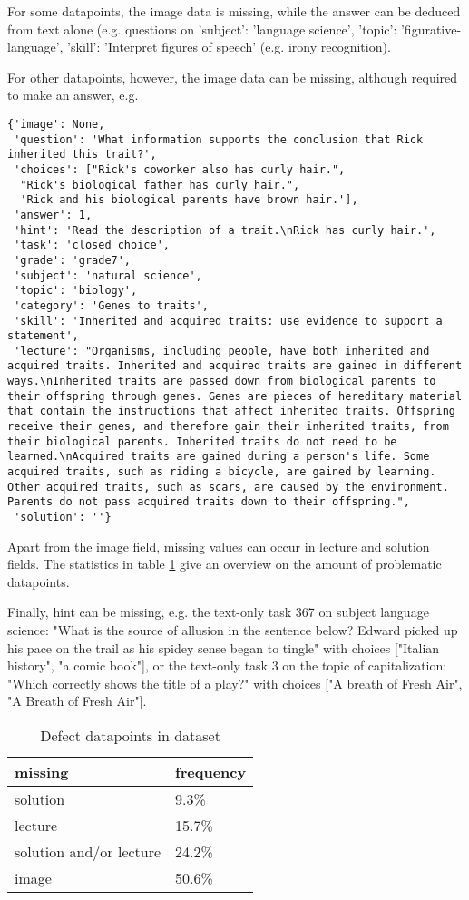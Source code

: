 \documentclass[10pt]{article}
\begin{document}
For some datapoints, the image data is missing, while the answer can be deduced from text alone (e.g. questions on 'subject': 'language science', 'topic': 'figurative-language', 'skill': 'Interpret figures of speech' (e.g. irony recognition). 

For other datapoints, however, the image data can be missing, although required to make an answer, e.g.
\begin{verbatim}
{'image': None,
 'question': 'What information supports the conclusion that Rick inherited this trait?',
 'choices': ["Rick's coworker also has curly hair.",
  "Rick's biological father has curly hair.",
  'Rick and his biological parents have brown hair.'],
 'answer': 1,
 'hint': 'Read the description of a trait.\nRick has curly hair.',
 'task': 'closed choice',
 'grade': 'grade7',
 'subject': 'natural science',
 'topic': 'biology',
 'category': 'Genes to traits',
 'skill': 'Inherited and acquired traits: use evidence to support a statement',
 'lecture': "Organisms, including people, have both inherited and acquired traits. Inherited and acquired traits are gained in different ways.\nInherited traits are passed down from biological parents to their offspring through genes. Genes are pieces of hereditary material that contain the instructions that affect inherited traits. Offspring receive their genes, and therefore gain their inherited traits, from their biological parents. Inherited traits do not need to be learned.\nAcquired traits are gained during a person's life. Some acquired traits, such as riding a bicycle, are gained by learning. Other acquired traits, such as scars, are caused by the environment. Parents do not pass acquired traits down to their offspring.",
 'solution': ''}
\end{verbatim}

Apart from the image field, missing values can occur in lecture and solution fields. The statistics in table \ref{table:dataset-stats} give an overview on the amount of problematic datapoints. 

Finally, hint can be missing, e.g. the text-only task 367 on subject language science: "What is the source of allusion in the sentence below? Edward picked up his pace on the trail as his spidey sense began to tingle" with choices ["Italian history", "a comic book"], or the text-only task 3 on the topic of capitalization: "Which correctly shows the title of a play?" with choices ["A breath of Fresh Air", "A Breath of Fresh Air"]. 

\begin{table}[h!]
\centering
\begin{tabular}{ll}\toprule
	missing & frequency \\\midrule
	solution & 9.3\% \\
	lecture & 15.7\% \\
	solution and/or lecture & 24.2\% \\
	image & 50.6\%\\\bottomrule
\end{tabular}
\caption{Defect datapoints in dataset}
\label{table:dataset-stats}
\end{table}
\end{document}
